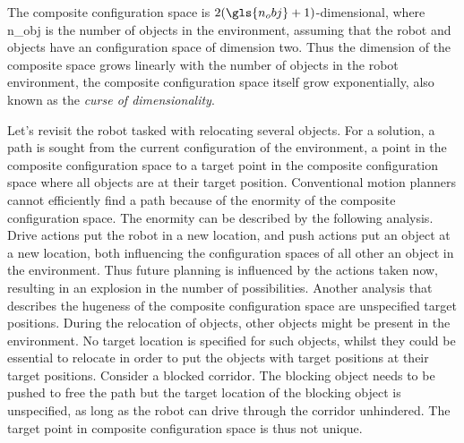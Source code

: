 The composite configuration space is $2(\gls{n_obj}+1)$-dimensional, where \gls{n_obj} is the number of objects in the environment, assuming that the robot and objects have an configuration space of dimension two. Thus the dimension of the composite space grows linearly with the number of objects in the robot environment, the composite configuration space itself grow exponentially, also known as the \textit{curse of dimensionality}.\bs



Let's revisit the robot tasked with relocating several objects. For a solution, a path is sought from the current configuration of the environment, a point in the composite configuration space to a target point in the composite configuration space where all objects are at their target position. Conventional motion planners cannot efficiently find a path because of the enormity of the composite configuration space. The enormity can be described by the following analysis. Drive actions put the robot in a new location, and push actions put an object at a new location, both influencing the configuration spaces of all other an object in the environment. Thus future planning is influenced by the actions taken now, resulting in an explosion in the number of possibilities.
Another analysis that describes the hugeness of the composite configuration space are unspecified target positions. During the relocation of objects, other objects might be present in the environment. No target location is specified for such objects, whilst they could be essential to relocate in order to put the objects with target positions at their target positions. Consider a blocked corridor. The blocking object needs to be pushed to free the path but the target location of the blocking object is unspecified, as long as the robot can drive through the corridor unhindered. The target point in composite configuration space is thus not unique.\bs
{}

